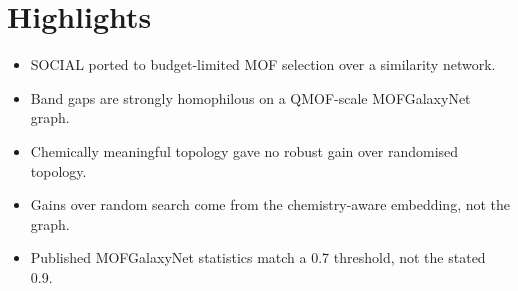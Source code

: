 \documentclass[12pt]{article}
\begin{document}
\section*{Highlights}
\begin{itemize}
  \item SOCIAL ported to budget-limited MOF selection over a similarity network.
  \item Band gaps are strongly homophilous on a QMOF-scale MOFGalaxyNet graph.
  \item Chemically meaningful topology gave no robust gain over randomised topology.
  \item Gains over random search come from the chemistry-aware embedding, not the graph.
  \item Published MOFGalaxyNet statistics match a 0.7 threshold, not the stated 0.9.
\end{itemize}
\end{document}
